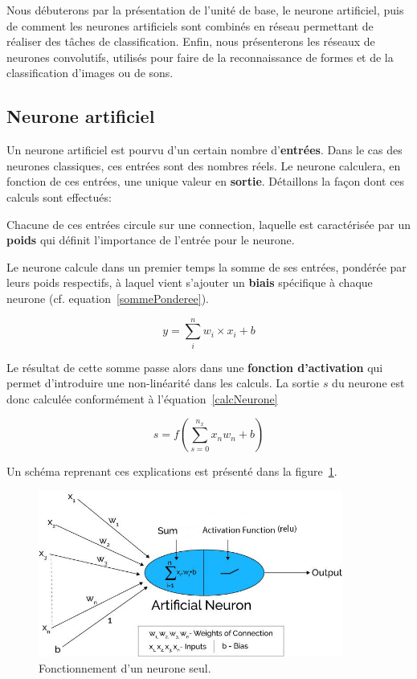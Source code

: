 Nous débuterons par  la présentation de l'unité de base, le neurone artificiel, puis de comment
les neurones artificiels sont combinés en réseau permettant de réaliser des tâches de classification.
Enfin, nous présenterons les réseaux de neurones convolutifs, utilisés pour faire de la reconnaissance de formes et de la classification d'images ou de sons.

\hypertarget{Neurone-artificiel}{%
\subsection{Neurone artificiel}
\label{Neurone-artificiel}}

Un neurone artificiel est pourvu d'un certain nombre d'\textbf{entrées}. Dans le cas des neurones classiques, ces entrées sont des nombres réels. Le neurone calculera, en fonction de ces entrées, une unique valeur en \textbf{sortie}.
Détaillons la façon dont ces calculs sont effectués:

Chacune de ces entrées circule sur une connection, laquelle est caractérisée par un \textbf{poids} qui définit l'importance de l'entrée pour le neurone.

Le neurone calcule dans un premier temps la somme de ses entrées, pondérée par leurs poids respectifs, à laquel vient s'ajouter un \textbf{biais} spécifique à chaque neurone (cf. equation~\ref{sommePonderee}).

\begin{equation}
\label{sommePonderee}
y = \sum_{i}^{n} w_i \times x_i + b
\end{equation}

Le résultat de cette somme passe alors dans une \textbf{fonction d'activation} qui permet d'introduire une non-linéarité dans les calculs. La sortie $s$ du neurone est donc calculée conformément à l'équation~\ref{calcNeurone}

\begin{equation}
\label{calcNeurone}
s = f(\sum_{s=0}^{n_{x}} x_{n}w_{n} + b)
\end{equation}

Un schéma reprenant ces explications est présenté dans la figure~\ref{neuroneSeul}.

\begin{figure}[h]
\centering
\includegraphics[width=10cm]{./images/image2.jpg}
\caption{Fonctionnement d'un neurone seul.\label{neuroneSeul}}
\end{figure}

